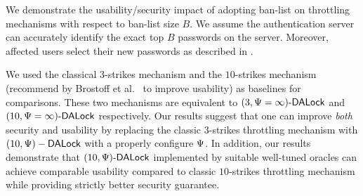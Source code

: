 


We demonstrate the usability/security impact of adopting ban-list on throttling mechanisms with respect to ban-list size $B$. We assume the authentication server can accurately identify the exact top $B$ passwords on the server. Moreover, affected users select their new passwords as described in .  

 We used the classical $3$-strikes mechanism and the $10$-strikes mechanism (recommend by Brostoff et al.~\cite{brostoff2003ten} to improve usability) as baselines for comparisons. These two mechanisms are equivalent to $(3, \Psi=\infty)\text{-}\mathsf{DALock}$ and $(10, \Psi=\infty)\text{-}\mathsf{DALock}$ respectively. Our results suggest that one can improve {\em both} security and usability by replacing the classic 3-strikes throttling mechanism with $(10,\Psi)-\mathsf{DALock}$ with a properly configure $\Psi$.  In addition, our results demonstrate that $(10, \Psi)\text{-}\mathsf{DALock}$ implemented by suitable well-tuned oracles can achieve comparable usability compared to classic $10$-strikes throttling mechanism while providing strictly better security guarantee. 







